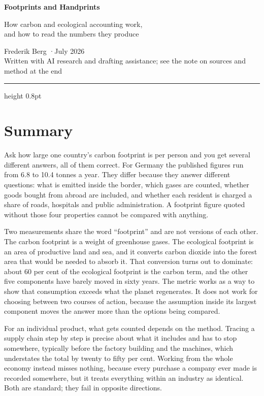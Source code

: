 \documentclass[11pt,a4paper]{article}
\begin{document}
\thispagestyle{empty}

\begin{center}
  {\LARGE\bfseries Footprints and Handprints\par}
  \vspace{5pt}
  {\large How carbon and ecological accounting work,\\
   and how to read the numbers they produce\par}
  \vspace{11pt}
  {\small Frederik Berg \quad·\quad July 2026}\\[5pt]
  {\footnotesize\color{gray}Written with AI research and drafting assistance;
   see the note on sources and method at the end}
\end{center}

\vspace{5pt}
\hrule height 0.8pt
\vspace{15pt}

\section*{Summary}

Ask how large one country's carbon footprint is per person and you get several
different answers, all of them correct. For Germany the published figures run
from 6.8 to 10.4 tonnes a year. They differ because they answer different
questions: what is emitted inside the border, which gases are counted, whether
goods bought from abroad are included, and whether each resident is charged a
share of roads, hospitals and public administration. A footprint figure quoted
without those four properties cannot be compared with anything.

Two measurements share the word \enquote{footprint} and are not versions of each
other. The carbon footprint is a weight of greenhouse gases. The ecological
footprint is an area of productive land and sea, and it converts carbon dioxide
into the forest area that would be needed to absorb it. That conversion turns out
to dominate: about 60 per cent of the ecological footprint is the carbon term, and
the other five components have barely moved in sixty years. The metric works as a
way to show that consumption exceeds what the planet regenerates. It does not work
for choosing between two courses of action, because the assumption inside its
largest component moves the answer more than the options being compared.

For an individual product, what gets counted depends on the method. Tracing a
supply chain step by step is precise about what it includes and has to stop
somewhere, typically before the factory building and the machines, which
understates the total by twenty to fifty per cent. Working from the whole economy
instead misses nothing, because every purchase a company ever made is recorded
somewhere, but it treats everything within an industry as identical. Both are
standard; they fail in opposite directions.
\end{document}
